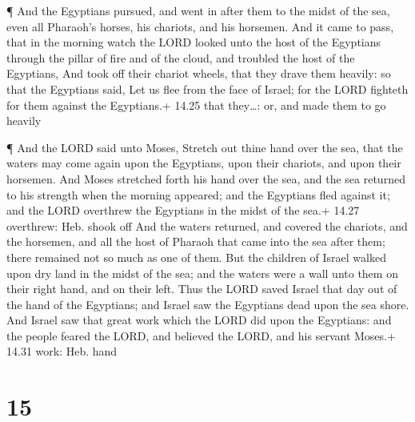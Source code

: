  ¶ And the Egyptians pursued, and went in after them to the
midst of the sea, even all Pharaoh's horses, his chariots, and his
horsemen.  And it came to pass, that in the morning watch
the LORD looked unto the host of the Egyptians through the pillar of
fire and of the cloud, and troubled the host of the Egyptians,
 And took off their chariot wheels, that they drave them
heavily: so that the Egyptians said, Let us flee from the face of
Israel; for the LORD fighteth for them against the Egyptians.+ 14.25
that they\ldots: or, and made them to go heavily

 ¶ And the LORD said unto Moses, Stretch out thine hand
over the sea, that the waters may come again upon the Egyptians, upon
their chariots, and upon their horsemen.  And Moses
stretched forth his hand over the sea, and the sea returned to his
strength when the morning appeared; and the Egyptians fled against it;
and the LORD overthrew the Egyptians in the midst of the sea.+ 14.27
overthrew: Heb. shook off  And the waters returned, and
covered the chariots, and the horsemen, and all the host of Pharaoh that
came into the sea after them; there remained not so much as one of them.
 But the children of Israel walked upon dry land in the
midst of the sea; and the waters were a wall unto them on their right
hand, and on their left.  Thus the LORD saved Israel that
day out of the hand of the Egyptians; and Israel saw the Egyptians dead
upon the sea shore.  And Israel saw that great work which
the LORD did upon the Egyptians: and the people feared the LORD, and
believed the LORD, and his servant Moses.+ 14.31 work: Heb. hand

\hypertarget{section-14}{%
\section{15}\label{section-14}}

